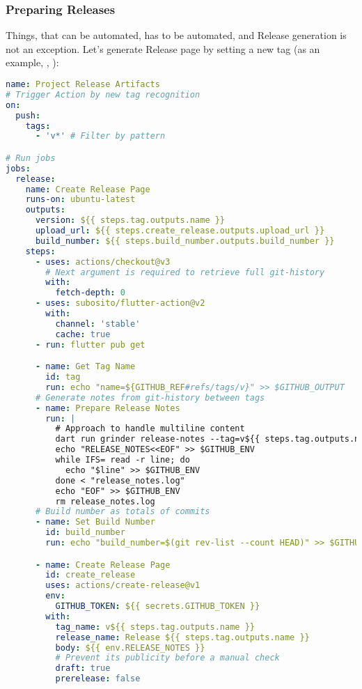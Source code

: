 \subsubsection{Preparing Releases}

Things, that can be automated, has to be automated, and Release generation is not an exception. Let's generate Release
page by setting a new tag (as an example, , ):

\begin{lstlisting}[language=yaml]
name: Project Release Artifacts
# Trigger Action by new tag recognition
on:
  push:
    tags:
      - 'v*' # Filter by pattern

# Run jobs
jobs:
  release:
    name: Create Release Page
    runs-on: ubuntu-latest
    outputs:
      version: ${{ steps.tag.outputs.name }}
      upload_url: ${{ steps.create_release.outputs.upload_url }}
      build_number: ${{ steps.build_number.outputs.build_number }}
    steps:
      - uses: actions/checkout@v3
        # Next argument is required to retrieve full git-history
        with:
          fetch-depth: 0
      - uses: subosito/flutter-action@v2
        with:
          channel: 'stable'
          cache: true
      - run: flutter pub get

      - name: Get Tag Name
        id: tag
        run: echo "name=${GITHUB_REF#refs/tags/v}" >> $GITHUB_OUTPUT
      # Generate notes from git-history between tags
      - name: Prepare Release Notes
        run: |
          # Approach to handle multiline content 
          dart run grinder release-notes --tag=v${{ steps.tag.outputs.name }} --output=release_notes.log
          echo "RELEASE_NOTES<<EOF" >> $GITHUB_ENV
          while IFS= read -r line; do
            echo "$line" >> $GITHUB_ENV
          done < "release_notes.log"
          echo "EOF" >> $GITHUB_ENV
          rm release_notes.log
      # Build number as totals of commits
      - name: Set Build Number
        id: build_number
        run: echo "build_number=$(git rev-list --count HEAD)" >> $GITHUB_OUTPUT

      - name: Create Release Page
        id: create_release
        uses: actions/create-release@v1
        env:
          GITHUB_TOKEN: ${{ secrets.GITHUB_TOKEN }}
        with:
          tag_name: v${{ steps.tag.outputs.name }}
          release_name: Release ${{ steps.tag.outputs.name }}
          body: ${{ env.RELEASE_NOTES }}
          # Prevent its publicity before a manual check
          draft: true
          prerelease: false
\end{lstlisting}


